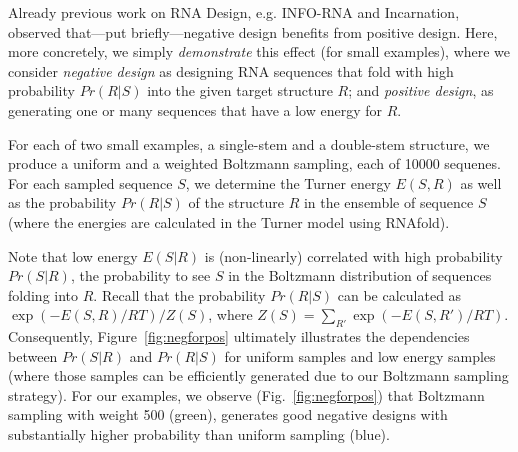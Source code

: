 \documentclass[10pt]{article}
\newcommand{\Def}[1]{\emph{#1}}
\begin{document}
Already previous work on RNA Design, e.g. INFO-RNA and Incarnation, observed
that---put briefly---negative design benefits from positive design. Here, more
concretely, we simply \emph{demonstrate} this effect (for small examples), where
we consider \Def{negative design} as  
designing RNA sequences that fold with high probability $Pr(R|S)$ into the
given target structure $R$; and \Def{positive design}, as generating one or
many sequences that have a low energy for $R$.

For each of two small examples, a single-stem and a double-stem structure, we produce a uniform and a weighted Boltzmann
sampling, each of 10000 sequenes. For each sampled sequence $S$, we determine
the Turner energy $E(S,R)$ as well as the
probability $Pr(R|S)$ of the structure $R$ in the ensemble of sequence $S$ 
(where the energies are calculated in the Turner model using RNAfold). 

Note that low energy $E(S|R)$ is (non-linearly) correlated with high
probability $Pr(S|R)$, the probability to see $S$ in the Boltzmann distribution
of sequences folding into $R$. Recall that the probability $Pr(R|S)$ can be
calculated as $\exp(-E(S,R)/RT)/Z(S)$,
where $Z(S)=\sum_{R'} \exp(-E(S,R')/RT)$.
%
Consequently, Figure~\ref{fig:negforpos} ultimately illustrates the dependencies
between $Pr(S|R)$ and $Pr(R|S)$ for uniform samples and low energy samples
(where those samples can be efficiently generated due to our Boltzmann sampling
strategy). For our examples, we observe (Fig.~\ref{fig:negforpos}) that Boltzmann sampling with weight 500 (green), generates good negative designs 
with substantially higher probability than uniform sampling (blue).

% 
\end{document}
